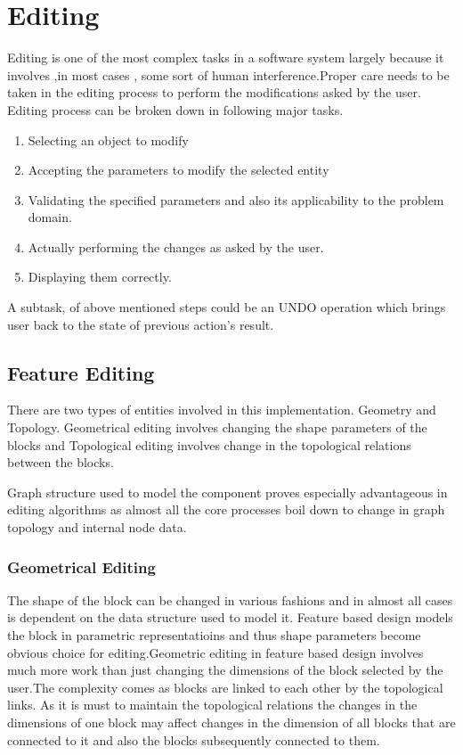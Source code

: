 \chapter{Editing}


	Editing is one of the most complex tasks in a software system largely
	because it involves ,in most cases , some sort of human interference.Proper
	care needs to be taken in the editing process to perform the modifications
	asked by the user. Editing process can be broken down in following major
	tasks.

	\begin{enumerate}

	\item
	Selecting an object to modify
	\item
	Accepting the parameters to modify the selected entity 
	\item
	Validating the specified  parameters and also its applicability to the
		problem domain.
	\item
	Actually performing the changes as asked by the user.
	\item
	Displaying them correctly.

	\end{enumerate}

	A subtask, of above mentioned steps could be an UNDO operation which
	brings user back to the state of previous action's result.


	\section{ Feature Editing }

	There are two types of entities involved in this implementation.
	Geometry and Topology. Geometrical editing involves changing the shape
	parameters of the blocks and Topological editing involves change in the
	topological relations between the blocks.

	Graph structure used to model the component proves especially advantageous
	in editing algorithms as almost all the core processes boil down to change
	in graph topology and internal node data.~\cite{Howard}

	\subsection{Geometrical Editing} 

		The shape of the block can be changed in various fashions and in almost
	all cases is dependent on the data structure used to model it. Feature
	based design models the block in parametric representatioins and thus shape
	parameters become obvious choice for editing.Geometric editing in feature
	based design involves much more work than just changing the dimensions of
	the block selected by the user.The complexity comes as blocks are linked
	to each other by the topological links. As it is must to maintain the
	topological relations the changes in the dimensions of one block may
	affect changes in the dimension of all blocks that are connected to it
	and also the blocks subsequently connected to them.

